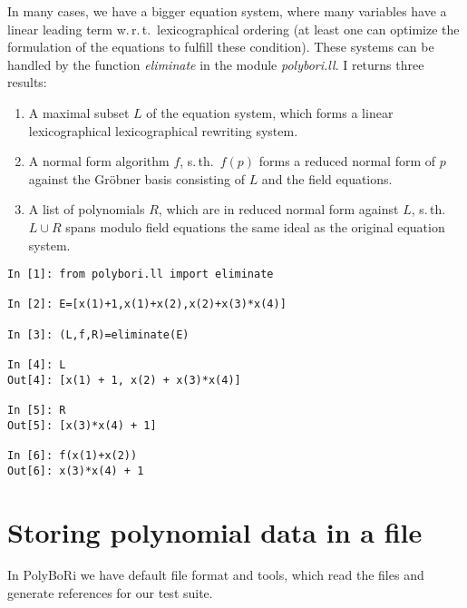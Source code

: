 \documentclass[]{article}
\newcommand{\PolyBoRi}{{\sc PolyBoRi}\xspace}
\newcommand{\Groebner}{Gr\"{o}bner\xspace}
\newcommand{\functionname}[1]{\textit{#1}\xspace}
\newcounter{thm}
\begin{document}
In many cases, we have a bigger equation system, where many variables have a linear leading term w.\,r.\,t.\ lexicographical ordering (at least one can optimize the formulation of the equations to fulfill these condition).
%
These systems can be handled by the function \functionname{eliminate} in the module \functionname{polybori.ll}.
I returns three results:
\begin{enumerate}
    \item A maximal subset $L$ of the equation system, which forms a linear lexicographical lexicographical rewriting system.
    \item A normal form algorithm $f$, s.\,th.\ $f(p)$ forms a reduced normal form of $p$ against the \Groebner basis consisting of $L$ and the field equations.
    \item A list of polynomials $R$, which are in reduced normal form against $L$, s.\,th.\ $L\cup R$ spans modulo field equations the same ideal as the original equation system.
\end{enumerate}

\begin{lstlisting}
In [1]: from polybori.ll import eliminate

In [2]: E=[x(1)+1,x(1)+x(2),x(2)+x(3)*x(4)]

In [3]: (L,f,R)=eliminate(E)

In [4]: L
Out[4]: [x(1) + 1, x(2) + x(3)*x(4)]

In [5]: R
Out[5]: [x(3)*x(4) + 1]

In [6]: f(x(1)+x(2))
Out[6]: x(3)*x(4) + 1
\end{lstlisting}

\section{Storing polynomial data in a file}

In \PolyBoRi we have default file format and tools, which read the files and generate references for our test suite.
\end{document}
